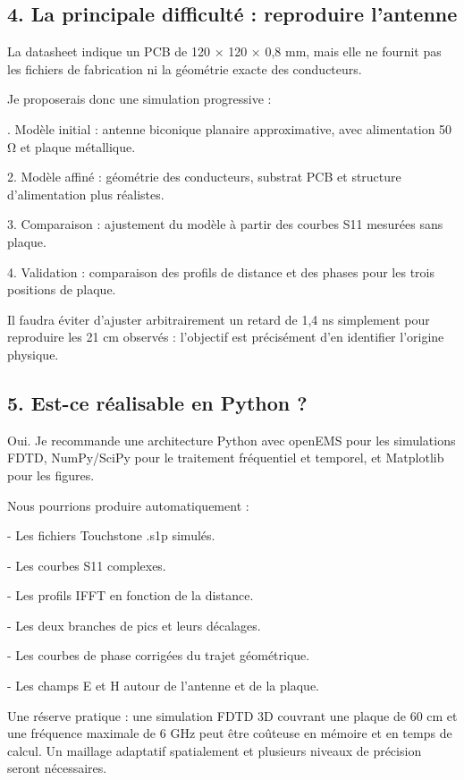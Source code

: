 \documentclass[11pt,a4paper]{article}
\begin{document}
\subsection*{4. La principale difficulté : reproduire l'antenne}
\par\medskip
La datasheet indique un PCB de 120 × 120 × 0,8 mm, mais elle ne fournit pas les fichiers de fabrication ni la géométrie exacte des conducteurs.\par
\par\medskip
Je proposerais donc une simulation progressive :\par
\par{}. Modèle initial : antenne biconique planaire approximative, avec alimentation 50 Ω et plaque métallique.\par
2. Modèle affiné : géométrie des conducteurs, substrat PCB et structure d'alimentation plus réalistes.\par
3. Comparaison : ajustement du modèle à partir des courbes S11 mesurées sans plaque.\par
4. Validation : comparaison des profils de distance et des phases pour les trois positions de plaque.\par
\par\medskip
Il faudra éviter d'ajuster arbitrairement un retard de 1,4 ns simplement pour reproduire les 21 cm observés : l'objectif est précisément d'en identifier l'origine physique.\par
\par\medskip
\subsection*{5. Est-ce réalisable en Python ?}
\par\medskip
Oui. Je recommande une architecture Python avec openEMS pour les simulations FDTD, NumPy/SciPy pour le traitement fréquentiel et temporel, et Matplotlib pour les figures.\par
\par\medskip
Nous pourrions produire automatiquement :\par
\par\medskip
- Les fichiers Touchstone .s1p simulés.\par
- Les courbes S11 complexes.\par
- Les profils IFFT en fonction de la distance.\par
- Les deux branches de pics et leurs décalages.\par
- Les courbes de phase corrigées du trajet géométrique.\par
- Les champs E et H autour de l'antenne et de la plaque.\par
\par\medskip
Une réserve pratique : une simulation FDTD 3D couvrant une plaque de 60 cm et une fréquence maximale de 6 GHz peut être coûteuse en mémoire et en temps de calcul. Un maillage adaptatif spatialement et plusieurs niveaux de précision seront nécessaires.\par
\par\medskip
\end{document}
